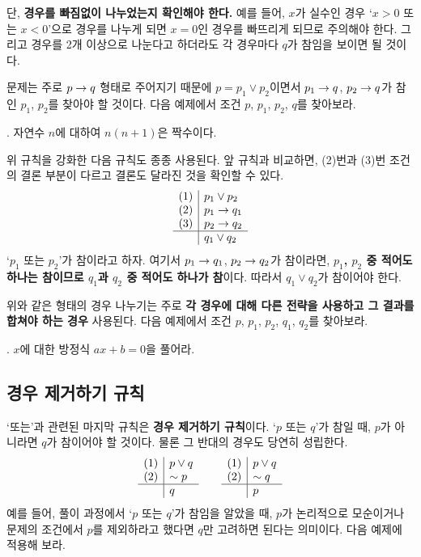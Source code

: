 단, \textbf{경우를 빠짐없이 나누었는지 확인해야 한다.} 예를 들어, \(x\)가 실수인 경우 `\(x > 0\) 또는 \(x < 0\)'으로 경우를 나누게 되면 \(x = 0\)인 경우를 빠뜨리게 되므로 주의해야 한다. 그리고 경우를 2개 이상으로 나눈다고 하더라도 각 경우마다 \(q\)가 참임을 보이면 될 것이다.

문제는 주로 \(p \rightarrow q\) 형태로 주어지기 때문에 \(p = p_1 \vee p_2\)이면서 \(p_1 \rightarrow q\), \(p_2 \rightarrow q\)가 참인 \(p_1\), \(p_2\)를 찾아야 할 것이다. 다음 예제에서 조건 \(p\), \(p_1\), \(p_2\), \(q\)를 찾아보라.

\bigskip

\ex. 자연수 \(n\)에 대하여 \(n(n + 1)\)은 짝수이다.

\pagebreak

위 규칙을 강화한 다음 규칙도 종종 사용된다. 앞 규칙과 비교하면, (2)번과 (3)번 조건의 결론 부분이 다르고 결론도 달라진 것을 확인할 수 있다.
\[
    \begin{array}{c|l}
        (1) & p_1 \vee p_2 \\ (2) & p_1 \rightarrow q_1 \\ (3) & p_2 \rightarrow q_2 \\\hline & q_1 \vee q_2
    \end{array}
\]
`\(p_1\) 또는 \(p_2\)'가 참이라고 하자. 여기서 \(p_1 \rightarrow q_1\), \(p_2 \rightarrow q_2\)가 참이라면, \textbf{\(p_1\), \(p_2\) 중 적어도 하나는 참이므로 \(q_1\)과 \(q_2\) 중 적어도 하나가 참}이다. 따라서 \(q_1 \vee q_2\)가 참이어야 한다.

위와 같은 형태의 경우 나누기는 주로 \textbf{각 경우에 대해 다른 전략을 사용하고 그 결과를 합쳐야 하는 경우} 사용된다. 다음 예제에서 조건 \(p\), \(p_1\), \(p_2\), \(q_1\), \(q_2\)를 찾아보라.

\bigskip

\ex. \(x\)에 대한 방정식 \(ax + b = 0\)을 풀어라.

\pagebreak

\subsection{경우 제거하기 규칙}

`또는'과 관련된 마지막 규칙은 \textbf{경우 제거하기 규칙}이다. `\(p\) 또는 \(q\)'가 참일 때, \(p\)가 아니라면 \(q\)가 참이어야 할 것이다. 물론 그 반대의 경우도 당연히 성립한다.
\[
    \begin{array}{c|l}
        (1) & p \vee q \\ (2) & \sim p \\\hline & q
    \end{array}
    \qquad
    \begin{array}{c|l}
        (1) & p \vee q \\ (2) & \sim q \\\hline & p
    \end{array}
\]
예를 들어, 풀이 과정에서 `\(p\) 또는 \(q\)'가 참임을 알았을 때, \(p\)가 논리적으로 모순이거나 문제의 조건에서 \(p\)를 제외하라고 했다면 \(q\)만 고려하면 된다는 의미이다. 다음 예제에 적용해 보라.


